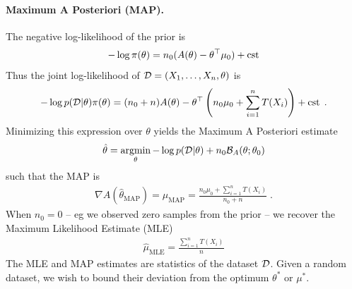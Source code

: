 \documentclass{article}
\newcommand{\logpart}{A}
\newcommand{\bregman}{\cB_\logpart}
\newcommand{\natp}{\theta}
\newcommand{\meanp}{\mu}
\begin{document}
\paragraph{Maximum A Posteriori (MAP).}
The negative log-likelihood of the prior is
\begin{align*}
    -\log \pi(\natp) = n_0 (\logpart(\natp)  - \natp^\top \meanp_0 ) + \cst
\end{align*}
Thus the joint log-likelihood of $\cD =(X_1,\dots,X_n,\natp)$ is
\begin{align}
    -\log p(\cD|\natp)\pi(\natp) 
    = (n_0+n) \logpart (\natp) 
    - \theta^\top \left(n_0 \meanp_0 + \sum_{i=1}^n T(X_i) \right) + \cst \; .
\end{align}
Minimizing this expression over $\natp$ yields the Maximum A Posteriori estimate
\begin{align}
    \hat \natp = \argmin_\natp -\log p(\cD|\natp) + n_0 \bregman(\natp ; \natp_0)
\end{align}
such that the MAP is
\begin{align}
    \nabla \logpart(\hat \natp_\text{MAP}) = \hat \meanp_\text{MAP}
    = \frac{n_0 \meanp_0 + \sum_{i=1}^n T(X_i) }{n_0+n} \; .
\end{align}
When $n_0=0$ -- eg we observed zero samples from the prior -- we recover the Maximum Likelihood Estimate (MLE)
\begin{align}
	\hat \mu_\text{MLE} = \frac{\sum_{i=1}^n T(X_i)}{n}
\end{align}
The MLE and MAP estimates are statistics of the dataset ${\mathcal D}$. Given a random dataset, we wish to bound their deviation from the optimum $\natp^*$ or $\meanp^*$.
\end{document}
